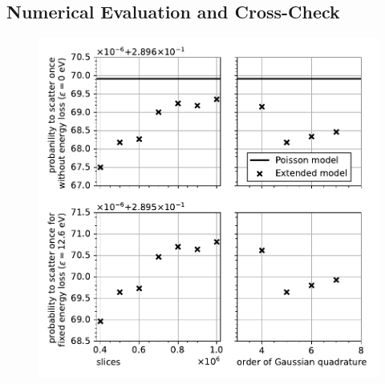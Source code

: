 \subsection{Numerical Evaluation and Cross-Check}
\label{sec:appendixEDepScatCrossSecExtendedModelNumEval}
\begin{figure}[t]
    \centering
    \includegraphics{chapter/energyDependentCrossSec/appendix/fig/scatProb1_numericalAccuracy.pdf}

\end{figure}
